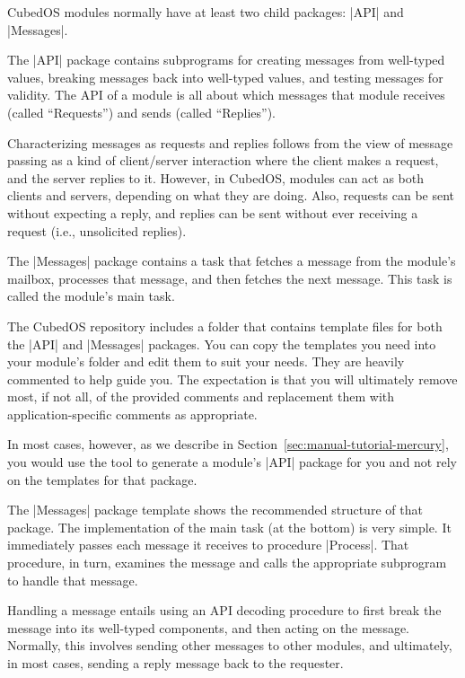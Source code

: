 CubedOS modules normally have at least two child packages: |API| and |Messages|.

The |API| package contains subprograms for creating messages from well-typed values, breaking
messages back into well-typed values, and testing messages for validity. The API of a module is
all about which messages that module receives (called ``Requests'') and sends (called
``Replies'').

Characterizing messages as requests and replies follows from the view of message passing as a
kind of client/server interaction where the client makes a request, and the server replies to
it. However, in CubedOS, modules can act as both clients and servers, depending on what they are
doing. Also, requests can be sent without expecting a reply, and replies can be sent without ever
receiving a request (i.e., unsolicited replies).

The |Messages| package contains a task that fetches a message from the module's mailbox,
processes that message, and then fetches the next message. This task is called the module's main
task.

The CubedOS repository includes a folder  that contains template files for
both the |API| and |Messages| packages. You can copy the templates you need into your module's
 folder and edit them to suit your needs. They are heavily commented to help guide
you. The expectation is that you will ultimately remove most, if not all, of the provided
comments and replacement them with application-specific comments as appropriate.

In most cases, however, as we describe in Section~\ref{sec:manual-tutorial-mercury}, you would
use the  tool to generate a module's |API| package for you and not rely on the
templates for that package.

The |Messages| package template shows the recommended structure of that package. The
implementation of the main task (at the bottom) is very simple. It immediately passes each
message it receives to procedure |Process|. That procedure, in turn, examines the message and
calls the appropriate subprogram to handle that message.

Handling a message entails using an API decoding procedure to first break the message into its
well-typed components, and then acting on the message. Normally, this involves sending other
messages to other modules, and ultimately, in most cases, sending a reply message back to the
requester.

